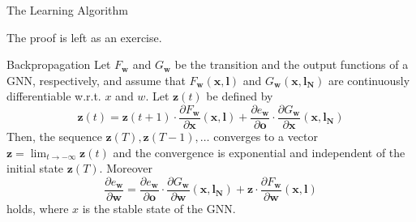 \documentclass[10pt,aspectratio=169]{beamer}
\begin{document}
\begin{frame}[allowframebreaks]{The Learning Algorithm}
    \begin{tiny}
        The proof is left as an exercise.
    \end{tiny}

    \begin{theorem}{Backpropagation}
        Let $F_{\boldsymbol{w}}$ and $G_{\boldsymbol{w}}$ be the transition and the output functions of a GNN, respectively, and assume that $F_{\boldsymbol{w}}(\boldsymbol{x}, \boldsymbol{l})$ and $G_{\boldsymbol{w}}\left(\boldsymbol{x}, \boldsymbol{l}_{\boldsymbol{N}}\right)$ are continuously differentiable w.r.t. $x$ and $w$. Let $\boldsymbol{z}(t)$ be defined by
        \begin{equation}
            \boldsymbol{z}(t)=\boldsymbol{z}(t+1) \cdot \frac{\partial F_{\boldsymbol{w}}}{\partial \boldsymbol{x}}(\boldsymbol{x}, \boldsymbol{l})+\frac{\partial e_{\boldsymbol{w}}}{\partial \boldsymbol{o}} \cdot \frac{\partial G_{\boldsymbol{w}}}{\partial \boldsymbol{x}}\left(\boldsymbol{x}, \boldsymbol{l}_{\boldsymbol{N}}\right)
        \end{equation}
        Then, the sequence $\boldsymbol{z}(T), \boldsymbol{z}(T-1), \ldots$ converges to a vector $\boldsymbol{z}=\lim _{t \rightarrow-\infty} \boldsymbol{z}(t)$ and the convergence is exponential and independent of the initial state $\boldsymbol{z}(T) .$ Moreover
        \begin{equation}
            \frac{\partial e_{\boldsymbol{w}}}{\partial \boldsymbol{w}}=\frac{\partial e_{\boldsymbol{w}}}{\partial \boldsymbol{o}} \cdot \frac{\partial G_{\boldsymbol{w}}}{\partial \boldsymbol{w}}\left(\boldsymbol{x}, \boldsymbol{l}_{\boldsymbol{N}}\right)+\boldsymbol{z} \cdot \frac{\partial F_{\boldsymbol{w}}}{\partial \boldsymbol{w}}(\boldsymbol{x}, \boldsymbol{l})
        \end{equation}
        holds, where $x$ is the stable state of the GNN.
    \end{theorem}



\end{frame}
\end{document}
